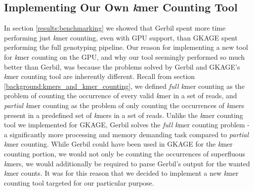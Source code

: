 \subsection{Implementing Our Own \textit{k}mer Counting Tool} \label{discussion:implementing_our_own_kmer_counting_tool}
In section \ref{results:benchmarking} we showed that Gerbil spent more time performing just \textit{k}mer counting, even with GPU support, than GKAGE spent performing the full genotyping pipeline.
Our reason for implementing a new tool for \textit{k}mer counting on the GPU, and why our tool seemingly performed so much better than Gerbil, was because the problems solved by Gerbil and GKAGE's \textit{k}mer counting tool are inherently different.
Recall from section \ref{background:kmers_and_kmer_counting}, we defined \textit{full k}mer counting as the problem of counting the occurrence of every valid \textit{k}mer in a set of reads, and \textit{partial k}mer counting as the problem of only counting the occurrences of \textit{k}mers present in a predefined set of \textit{k}mers in a set of reads.
Unlike the \textit{k}mer counting tool we implemented for GKAGE, Gerbil solves the \textit{full k}mer counting problem - a significantly more processing and memory demanding task compared to \textit{partial k}mer counting.
While Gerbil could have been used in GKAGE for the \textit{k}mer counting portion, we would not only be counting the occurrences of superfluous \textit{k}mers, we would additionally be required to parse Gerbil's output for the wanted \textit{k}mer counts.
It was for this reason that we decided to implement a new \textit{k}mer counting tool targeted for our particular purpose.
